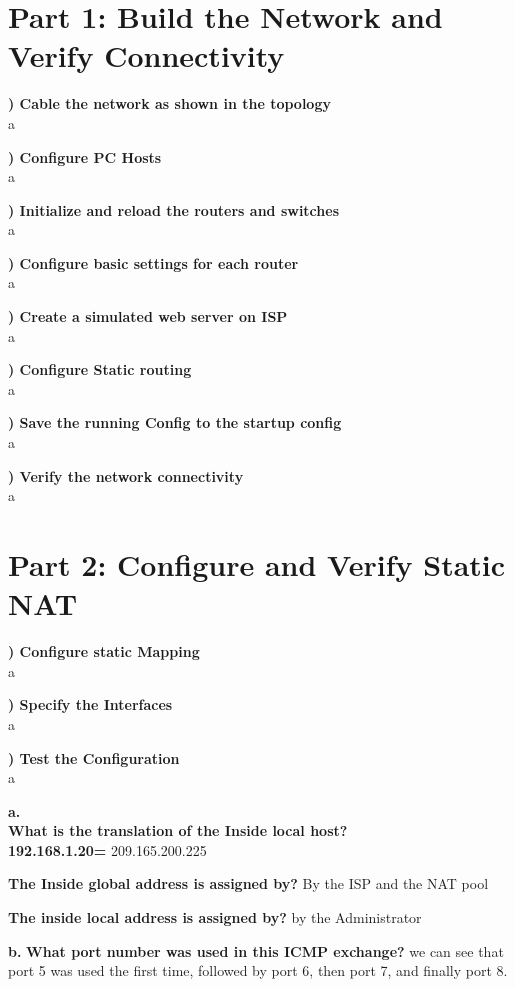 \documentclass{report}
\title{\classinfo}
\author{\semester}
\date{\today}
\newcommand{\mysection}[1]{\section*{#1}}
\newcommand{\mysubsection}[2]{\textbf{\romannumeral #1) #2}}
\begin{document}
\maketitle

\mysection{\textbf{Part 1: Build the Network and Verify Connectivity}}

\mysubsection{1}{Cable the network as shown in the topology}\\
a

\noindent\mysubsection{2}{Configure PC Hosts}\\
a

\noindent\mysubsection{3}{Initialize and reload the routers and switches}\\
a

\noindent\mysubsection{4}{Configure basic settings for each router}\\
a

\noindent\mysubsection{5}{Create a simulated web server on ISP}\\
a

\noindent\mysubsection{6}{Configure Static routing}\\
a

\noindent\mysubsection{7}{Save the running Config to the startup config}\\
a

\noindent\mysubsection{8}{Verify the network connectivity}\\
a




\mysection{\textbf{Part 2: Configure and Verify Static NAT}}

\mysubsection{1}{Configure static Mapping}\\
a

\noindent\mysubsection{2}{Specify the Interfaces}\\
a

\noindent\mysubsection{3}{Test the Configuration}\\
a

{\bf{a.}}\\
{\bf{What is the translation of the Inside local host?}}\\
{\bf{192.168.1.20=}} 209.165.200.225


{\bf{The Inside global address is assigned by?}} By the ISP and the NAT pool


{\bf{The inside local address is assigned by?}} by the Administrator

{\bf{b.}}
{\bf{What port number was used in this ICMP exchange?}} we can see that port 5
was used the first time, followed by port 6, then port 7, and finally port 8.
\end{document}

